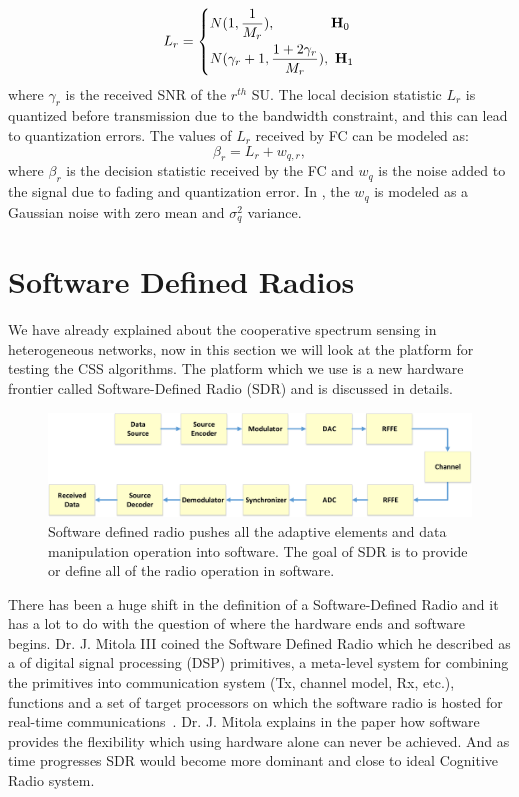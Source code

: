 \begin{equation}
	\label{eq:6}
	L_r = 
	\left\{
	\begin{aligned}
		& N(1,\dfrac{1}{M_r}),~~~~~~~~~~~~\mathbf{H}_0 \\
		& N(\gamma_r+1,\dfrac{1+2\gamma_r}{M_r}),~\mathbf{H}_1		
	\end{aligned}
	\right.
\end{equation}
where $\gamma_r$ is the received SNR of the $r^{th}$ SU. The local decision statistic $L_r$ is quantized before transmission due to the bandwidth constraint, and this can lead to quantization errors. The values of $L_r$ received by FC can be modeled as:
\begin{equation}
	\label{eq:7}
	 \beta_r = L_r + w_{q,r},
\end{equation}
where $\beta_r$ is the decision statistic received by the FC and $w_q$ is the noise added to the signal due to fading and quantization error. In \cite{arhtn14}, the $w_q$ is modeled as a Gaussian noise with zero mean and $\sigma_q^2$ variance.

\section{Software Defined Radios}
We have already explained about the cooperative spectrum sensing in heterogeneous networks, now in this section we will look at the platform for testing the CSS algorithms. The platform which we use is a new hardware frontier called Software-Defined Radio (SDR) and is discussed in details.

\begin{figure}[ht!]
	\centering
	\includegraphics[width=\textwidth,keepaspectratio]{images/Gill/figs/softwaredefinedradio.eps}
    \caption{Software defined radio pushes all the adaptive elements and data manipulation operation into software. The goal of SDR is to provide or define all of the radio operation in software.} 
\label{sdr}      
\end{figure}

There has been a huge shift in the definition of a Software-Defined Radio and it has a lot to do with the question of where the hardware ends and software begins. Dr. J. Mitola III coined the Software Defined Radio which he described as a of digital signal processing (DSP) primitives, a meta-level system for combining the primitives into communication system (Tx, channel model, Rx, etc.), functions and a set of target processors on which the software radio is hosted for real-time communications~\cite{267870}. Dr. J. Mitola explains in the paper how software provides the flexibility which using hardware alone can never be achieved. And as time progresses SDR would become more dominant and close to ideal Cognitive Radio system.

